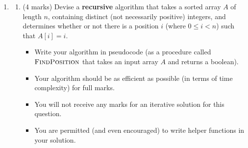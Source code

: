 \documentclass[a4,13pt]{extarticle}
\newenvironment{Solution}{\color{blue}\textbf{Solution:}}{}
\begin{document}
\begin{enumerate}
\begin{enumerate}
			\begin{Solution}
				
				While this can be true in some cases, it can not be generalised. This is because the Big-O of an algorithm is the the tightest bound of the algorithm from above, and thus the worst case, while Big-$\Omega$ is the tightest bound from below and thus the best case. If the best and worst case runtime of the algorithm are both equal, then the classmate's statement is correct.
			\end{Solution}
			  
			\medskip
	      	      	      	                  
	      	\item (1 mark) Prove that an algorithm runs in $\Theta (g(n))$ time if and only if its worst-case running time is $O(g(n))$ and its best-case running time is $\Omega(g(n))$.
	      	      
			\begin{Solution}
				
				
	      	\end{Solution}
	      	      	      	                  
	      \end{enumerate}
	      	          
	      \newpage 
	      	
	\item 
	      \begin{enumerate}
	      	\item (4 marks) Devise a \textbf{recursive} algorithm that takes a sorted array $A$ of length $n$, containing distinct (not necessarily positive) integers, and determines whether or not there is a position $i$ (where $0\leq i < n$) such that $A[i] = i$.
	      	      \begin{itemize}
	      	      	\item Write your algorithm in pseudocode (as a procedure called $\textsc{FindPosition}$ that takes an input array $A$ and returns a boolean).
	      	      	\item Your algorithm should be as efficient as possible (in terms of time complexity) for full marks.
	      	      	\item You will not receive any marks for an iterative solution for this question. 
	      	      	\item You are permitted (and even encouraged) to write helper functions in your solution.
	      	      \end{itemize}
	      	      

\end{enumerate}
\end{enumerate}
\end{document}
